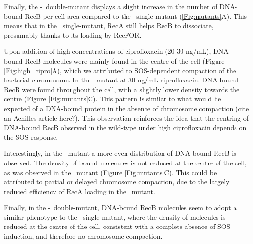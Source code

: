 Finally, the \dreca-\teneighty\ double-mutant displays a slight increase in the number of DNA-bound RecB per cell area compared to the \teneighty\ single-mutant (\ref{Fig:mutants}A). This means that in the \teneighty\ single-mutant, RecA still helps RecB to dissociate, presumably thanks to its loading by RecFOR.

Upon addition of high concentrations of ciprofloxacin (20-30 ng/mL), DNA-bound RecB molecules were mainly found in the centre of the cell (Figure \ref{Fig:high_cipro}A), which we attributed to SOS-dependent compaction of the bacterial chromosome. In the \dreca\ mutant at 30 ng/mL ciprofloxacin, DNA-bound RecB were found throughout the cell, with a slightly lower density towards the centre (Figure \ref{Fig:mutants}C). This pattern is similar to what would be expected of a DNA-bound protein in the absence of chromosome compaction (cite an Achilles article here?). This observation reinforces the idea that the centring of DNA-bound RecB observed in the wild-type under high ciprofloxacin depends on the SOS response.

Interestingly, in the \teneighty\ mutant a more even distribution of DNA-bound RecB is observed. The density of bound molecules is not reduced at the centre of the cell, as was observed in the \dreca\ mutant (Figure \ref{Fig:mutants}C). This could be attributed to partial or delayed chromosome compaction, due to the largely reduced efficiency of RecA loading in the \teneighty\ mutant.

Finally, in the \dreca-\teneighty\ double-mutant, DNA-bound RecB molecules seem to adopt a similar phenotype to the \dreca\ single-mutant, where the density of molecules is reduced at the centre of the cell, consistent with a complete absence of SOS induction, and therefore no chromosome compaction.

